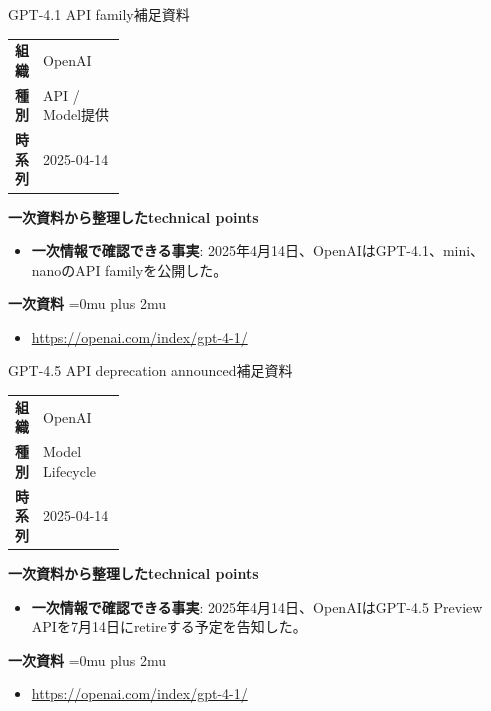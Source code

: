 \begin{technicalnote}{GPT-4.1 API family}{補足資料}
\begingroup
\begin{tabularx}{\linewidth}{@{}>{\bfseries}p{0.22\linewidth}X@{}}
組織 & OpenAI \\
種別 & API / Model提供 \\
時系列 & 2025-04-14 \\
\end{tabularx}
\smallskip
{\bfseries 一次資料から整理したtechnical points}
\begin{itemize}[leftmargin=1.5em,itemsep=0.35em]
\item \textbf{一次情報で確認できる事実}: 2025年4月14日、OpenAIはGPT-4.1、mini、nanoのAPI familyを公開した。
\end{itemize}
\begin{samepage}
{\bfseries 一次資料}
\begingroup\sloppy
\Urlmuskip=0mu plus 2mu\relax
\begin{itemize}[leftmargin=1.5em,itemsep=0.25em]
\item {\scriptsize\url{https://openai.com/index/gpt-4-1/}}
\end{itemize}
\endgroup
\end{samepage}
\endgroup
\end{technicalnote}
\medskip

\begin{technicalnote}{GPT-4.5 API deprecation announced}{補足資料}
\begingroup
\begin{tabularx}{\linewidth}{@{}>{\bfseries}p{0.22\linewidth}X@{}}
組織 & OpenAI \\
種別 & Model Lifecycle \\
時系列 & 2025-04-14 \\
\end{tabularx}
\smallskip
{\bfseries 一次資料から整理したtechnical points}
\begin{itemize}[leftmargin=1.5em,itemsep=0.35em]
\item \textbf{一次情報で確認できる事実}: 2025年4月14日、OpenAIはGPT-4.5 Preview APIを7月14日にretireする予定を告知した。
\end{itemize}
\begin{samepage}
{\bfseries 一次資料}
\begingroup\sloppy
\Urlmuskip=0mu plus 2mu\relax
\begin{itemize}[leftmargin=1.5em,itemsep=0.25em]
\item {\scriptsize\url{https://openai.com/index/gpt-4-1/}}
\end{itemize}
\endgroup
\end{samepage}
\endgroup
\end{technicalnote}
\medskip


